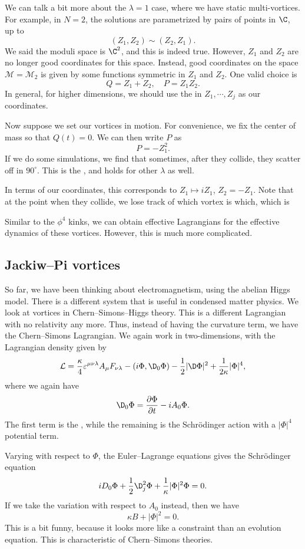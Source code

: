 \documentclass[a4paper]{article}
\begin{document}
We can talk a bit more about the $\lambda = 1$ case, where we have static multi-vortices. For example, in $N = 2$, the solutions are parametrized by pairs of points in $\C$, up to
\[
  (Z_1, Z_2) \sim (Z_2, Z_1).
\]
We said the moduli space is $\C^2$, and this is indeed true. However, $Z_1$ and $Z_2$ are no longer good coordinates for this space. Instead, good coordinates on the space $\mathcal{M} = \mathcal{M}_2$ is given by some functions symmetric in $Z_1$ and $Z_2$. One valid choice is
\[
  Q = Z_1 + Z_2,\quad P = Z_1 Z_2.
\]
In general, for higher dimensions, we should use the  in $Z_1, \cdots, Z_j$ as our coordinates. 

Now suppose we set our vortices in motion. For convenience, we fix the center of mass so that $Q(t) = 0$. We can then write $P$ as
\[
  P = - Z_1^2.
\]
If we do some simulations, we find that sometimes, after they collide, they scatter off in $90^\circ$. This is the , and holds for other $\lambda$ as well.

In terms of our coordinates, this corresponds to $Z_1 \mapsto i Z_1$, $Z_2 = - Z_1$. Note that at the point when they collide, we lose track of which vortex is which, which is 

Similar to the $\phi^4$ kinks, we can obtain effective Lagrangians for the effective dynamics of these vortices. However, this is much more complicated.

\subsection{Jackiw--Pi vortices}
So far, we have been thinking about electromagnetism, using the abelian Higgs model. There is a different system that is useful in condensed matter physics. We look at vortices in Chern--Simons--Higgs theory. This is a different Lagrangian with no relativity any more. Thus, instead of having the curvature term, we have the Chern--Simons Lagrangian. We again work in two-dimensions, with the Lagrangian density given by
\[
  \mathcal{L} = \frac{\kappa}{4} \varepsilon^{\mu\nu\lambda} A_\mu F_{\nu\lambda} - (i \Phi, \D_0 \Phi) - \frac{1}{2} | \D \Phi|^2 + \frac{1}{2\kappa} |\Phi|^4,
\]
where we again have
\[
  \D_0 \Phi = \frac{\partial \Phi}{\partial t} - i A_0 \Phi.
\]
The first term is the , while the remaining is the Schr\"odinger action with a $|\Phi|^4$ potential term.

Varying with respect to $\Phi$, the Euler--Lagrange equations gives the Schr\"odinger equation
\[
  i D_0 \Phi + \frac{1}{2} \D_j^2 \Phi + \frac{1}{\kappa} |\Phi|^2 \Phi = 0.
\]
If we take the variation with respect to $A_0$ instead, then we have
\[
  \kappa B + |\Phi|^2 = 0.
\]
This is a bit funny, because it looks more like a constraint than an evolution equation. This is characteristic of Chern--Simons theories.
\end{document}
